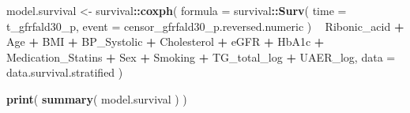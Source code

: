 \documentclass[]{article}
\newenvironment{Shaded}{\begin{snugshade}}{\end{snugshade}}
\newcommand{\DataTypeTok}[1]{\textcolor[rgb]{0.13,0.29,0.53}{#1}}
\newcommand{\KeywordTok}[1]{\textcolor[rgb]{0.13,0.29,0.53}{\textbf{#1}}}
\newcommand{\NormalTok}[1]{#1}
\newcommand{\OperatorTok}[1]{\textcolor[rgb]{0.81,0.36,0.00}{\textbf{#1}}}
\newcommand{\StringTok}[1]{\textcolor[rgb]{0.31,0.60,0.02}{#1}}
\begin{document}
\begin{Shaded}
\begin{Highlighting}[]
\NormalTok{model.survival <-}
\StringTok{  }\NormalTok{survival}\OperatorTok{::}\KeywordTok{coxph}\NormalTok{(}
    \DataTypeTok{formula =}
\NormalTok{      survival}\OperatorTok{::}\KeywordTok{Surv}\NormalTok{(}
        \DataTypeTok{time =}\NormalTok{ t_gfrfald30_p, }
        \DataTypeTok{event =}\NormalTok{ censor_gfrfald30_p.reversed.numeric}
\NormalTok{      ) }
    \OperatorTok{~}\StringTok{             }
\StringTok{      }\NormalTok{Ribonic_acid }\OperatorTok{+}
\StringTok{      }\NormalTok{Age }\OperatorTok{+}
\StringTok{      }\NormalTok{BMI }\OperatorTok{+}\StringTok{ }
\StringTok{      }\NormalTok{BP_Systolic }\OperatorTok{+}\StringTok{ }
\StringTok{      }\NormalTok{Cholesterol }\OperatorTok{+}\StringTok{ }
\StringTok{      }\NormalTok{eGFR }\OperatorTok{+}\StringTok{ }
\StringTok{      }\NormalTok{HbA1c }\OperatorTok{+}
\StringTok{      }\NormalTok{Medication_Statins }\OperatorTok{+}
\StringTok{      }\NormalTok{Sex }\OperatorTok{+}\StringTok{  }
\StringTok{      }\NormalTok{Smoking }\OperatorTok{+}\StringTok{ }
\StringTok{      }\NormalTok{TG_total_log }\OperatorTok{+}
\StringTok{      }\NormalTok{UAER_log, }
    \DataTypeTok{data =}\NormalTok{ data.survival.stratified}
\NormalTok{  )}

\KeywordTok{print}\NormalTok{( }\KeywordTok{summary}\NormalTok{( model.survival ) )}
\end{Highlighting}
\end{Shaded}
\end{document}
